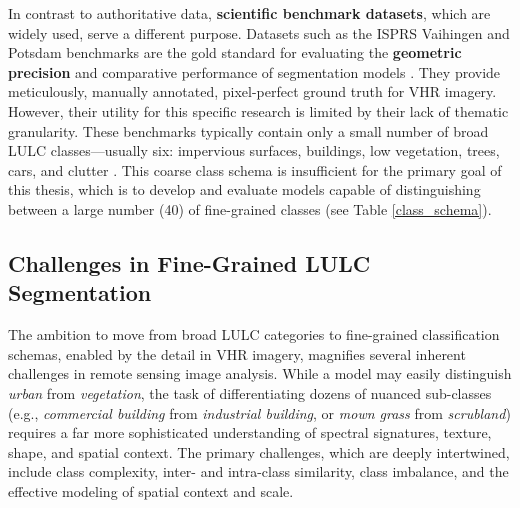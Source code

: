\documentclass{report}
\begin{document}
In contrast to authoritative data, \textbf{scientific benchmark datasets}, which are widely used, serve a different purpose. Datasets such as the ISPRS Vaihingen and Potsdam benchmarks are the gold standard for evaluating the \textbf{geometric precision} and comparative performance of segmentation models \parencites[p.~8ff.]{NeupaneEtAlDeepLearningBasedSemanticSegmentationUrbanFeaturesSatelliteImagesReviewMetaAnalysis2021}. They provide meticulously, manually annotated, pixel-perfect ground truth for VHR imagery. However, their utility for this specific research is limited by their lack of thematic granularity. These benchmarks typically contain only a small number of broad LULC classes—usually six: impervious surfaces, buildings, low vegetation, trees, cars, and clutter \parencites[p.~2;]{SertelEtAlLandUseLandCoverMappingUsingDeepLearningBasedSegmentationApproachesVHRWorldview3Images2022}[p.~3157]{XuEtAlsemanticsegmentationmethodcategoryboundaryLandUseLandCoverLULCmappingVeryHighResolutionVHRremotesensingimage2021}. This coarse class schema is insufficient for the primary goal of this thesis, which is to develop and evaluate models capable of distinguishing between a large number (40) of fine-grained classes (see Table \ref{class_schema}).
\subsection{Challenges in Fine-Grained LULC Segmentation}
\label{sec:challenges_fine_grained_LULC}
The ambition to move from broad LULC categories to fine-grained classification schemas, enabled by the detail in VHR imagery, magnifies several inherent challenges in remote sensing image analysis. While a model may easily distinguish \textit{urban} from \textit{vegetation}, the task of differentiating dozens of nuanced sub-classes (e.g., \textit{commercial building} from \textit{industrial building}, or \textit{mown grass} from \textit{scrubland}) requires a far more sophisticated understanding of spectral signatures, texture, shape, and spatial context. The primary challenges, which are deeply intertwined, include class complexity, inter- and intra-class similarity, class imbalance, and the effective modeling of spatial context and scale.
\end{document}

